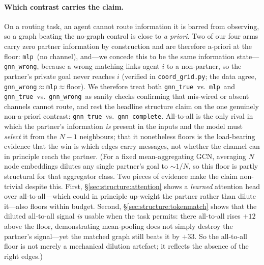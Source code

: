 \documentclass[10pt]{article}
\newcommand{\gtrue}{\texttt{gnn\_true}}
\newcommand{\gwrong}{\texttt{gnn\_wrong}}
\newcommand{\gcomplete}{\texttt{gnn\_complete}}
\newcommand{\mlpc}{\texttt{mlp}}
\begin{document}
\paragraph{Which contrast carries the claim.}
On a routing task, an agent cannot route information it is barred from
observing, so a graph beating the no-graph control is close to \emph{a
priori}. Two of our four arms carry zero partner information by
construction and are therefore a-priori at the floor: \mlpc\ (no channel),
and---we concede this to be the same information state---\gwrong, because a
wrong matching links agent $i$ to a non-partner, so the partner's private
goal never reaches $i$ (verified in \texttt{coord\_grid.py}; the data agree,
\gwrong${\approx}$\mlpc${\approx}$floor). We therefore treat both \gtrue\
vs.\ \mlpc\ and \gtrue\ vs.\ \gwrong\ as sanity checks confirming that
mis-wired or absent channels cannot route, and rest the headline structure
claim on the one genuinely non-a-priori contrast: \gtrue\ vs.\ \gcomplete.
All-to-all is the only rival in which the partner's information \emph{is}
present in the inputs and the model must \emph{select} it from the $N{-}1$
neighbours; that it nonetheless floors is the load-bearing evidence that the
win is which edges carry messages, not whether the channel can in principle
reach the partner. (For a fixed mean-aggregating GCN, averaging $N$ node
embeddings dilutes any single partner's goal to ${\sim}1/N$, so this
floor is partly structural for that aggregator class. Two pieces of evidence
make the claim non-trivial despite this. First, \S\ref{sec:structure:attention}
shows a \emph{learned} attention head over all-to-all---which could in
principle up-weight the partner rather than dilute it---also floors within
budget. Second, \S\ref{sec:structure:tokenmatch} shows that the diluted
all-to-all signal \emph{is} usable when the task permits: there all-to-all rises
$+12$ above the floor, demonstrating mean-pooling does not simply destroy the
partner's signal---yet the matched graph still beats it by $+33$. So the
all-to-all floor is not merely a mechanical dilution artefact; it reflects the
absence of the right edges.)
\end{document}
